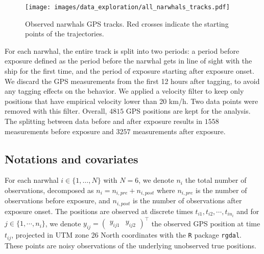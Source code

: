 \documentclass[aoas]{imsart}
\theoremstyle{definition}
\theoremstyle{remark}
\theoremstyle{remark}
\newcommand {\1}{\mathbb{1}}
\begin{document}
\begin{figure}[h!]
\centering
\texttt{[image: images/data\_exploration/all\_narwhals\_tracks.pdf]}
\caption{Observed narwhals GPS tracks. Red crosses indicate the starting points of the trajectories.}
\label{fig: observed GPS data}
\end{figure}


For each narwhal, the entire track is split into two periods: a period before exposure defined as the period before the narwhal gets in line of sight with the ship for the first time, and the period of exposure starting after exposure onset. We discard the GPS measurements from the first 12 hours after tagging, to avoid any tagging effects on the behavior. We applied a velocity filter to keep only positions that have empirical velocity lower than 20 km/h. Two data points were removed with this filter.
Overall, $4815$ GPS positions are kept for the analysis. The splitting between data before and after exposure results in $1558$ measurements before exposure and $3257$ measurements after exposure.

\subsection{Notations and covariates}
\label{subsection: covariates}

For each narwhal $i \in \{1,\ldots,N\}$ with $N=6$, we denote $n_i$ the total number of observations,   decomposed as $n_i=n_{i,pre}+n_{i,post}$ where $n_{i,pre}$ is the number of observations before exposure, and $n_{i,post}$ is the number of observations after exposure onset. The positions are observed at discrete times $t_{i1}, t_{i2}, \cdots,t_{in_i}$ and  for $j \in \{1,\cdots,n_i\}$, we denote $y_{ij}=\begin{pmatrix} y_{ij1} & y_{ij2} \end{pmatrix}^\top$ the observed GPS position at time $t_{ij}$, projected in UTM zone 26 North coordinates with the \texttt{R} package \texttt{rgdal}. These points are noisy observations of the underlying unobserved true positions.\\
\end{document}
